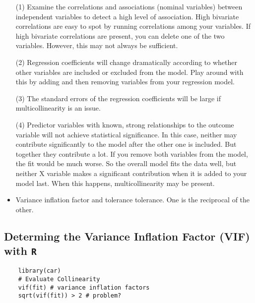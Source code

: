 \documentclass[a4paper,12pt]{article}
\begin{document}
\begin{itemize}
	\item [(1)] Examine the correlations and associations (nominal variables) between independent variables to detect a high level of association. High bivariate correlations are easy to spot by running correlations among your variables. If high bivariate correlations are present, you can delete one of the two variables. However, this may not always be sufficient.
	
	\item [(2)] Regression coefficients will change dramatically according to whether other variables are included or excluded from the model. Play around with this by adding and then removing variables from your regression model.
	
	\item [(3)] The standard errors of the regression coefficients will be large if multicollinearity is an issue.
	
	\item [(4)] Predictor variables with known, strong relationships to the outcome variable will not achieve statistical significance. In this case, neither may contribute significantly to the model after the other one is included. But together they contribute a lot. If you remove both variables from the model, the fit would be much worse. So the overall model fits the data well, but neither X variable makes a significant contribution when it is added to your model last. When this happens, multicollinearity may be present.
	\item Variance inflation factor and tolerance tolerance. One is the reciprocal of the other. 
	
\end{itemize}












		



\subsection{Determing the Variance Inflation Factor (VIF) with \texttt{R}}


\begin{framed}
	\begin{verbatim}
	library(car)
	# Evaluate Collinearity
	vif(fit) # variance inflation factors 
	sqrt(vif(fit)) > 2 # problem?
	\end{verbatim}
\end{framed}
\end{document}
